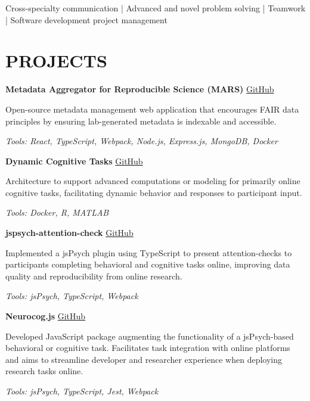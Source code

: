 \documentclass{article}
\begin{document}
  Cross-specialty communication | Advanced and novel problem solving | Teamwork | Software development project management

  \section*{\centering\uppercase{Projects}}

  \textbf{Metadata Aggregator for Reproducible Science (MARS)} \hfill \href{https://github.com/Brain-Development-and-Disorders-Lab/mars}{GitHub}

  Open-source metadata management web application that encourages FAIR data principles by ensuring lab-generated metadata is indexable and accessible.

  \textit{Tools: React, TypeScript, Webpack, Node.js, Express.js, MongoDB, Docker}

  \medbreak

  \textbf{Dynamic Cognitive Tasks} \hfill \href{https://github.com/Brain-Development-and-Disorders-Lab/mars}{GitHub}

  Architecture to support advanced computations or modeling for primarily online cognitive tasks, facilitating dynamic behavior and responses to participant input.

  \textit{Tools: Docker, R, MATLAB}

  \medbreak

  \textbf{jspsych-attention-check} \hfill \href{https://github.com/Brain-Development-and-Disorders-Lab/jspsych-attention-check}{GitHub}

  Implemented a jsPsych plugin using TypeScript to present attention-checks to participants completing behavioral and cognitive tasks online, improving data quality and reproducibility from online research.

  \textit{Tools: jsPsych, TypeScript, Webpack}

  \medbreak

  \textbf{Neurocog.js} \hfill \href{https://github.com/Brain-Development-and-Disorders-Lab/Neurocog.js}{GitHub}

  Developed JavaScript package augmenting the functionality of a jsPsych-based behavioral or cognitive task. Facilitates task integration with online platforms and aims to streamline developer and researcher experience when deploying research tasks online.

  \textit{Tools: jsPsych, TypeScript, Jest, Webpack}

  \pagebreak
\end{document}

